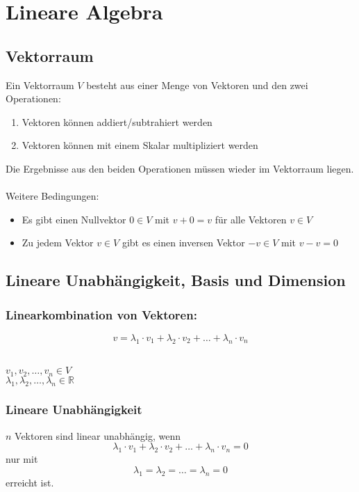 \chapter{Lineare Algebra}

\section{Vektorraum}

Ein Vektorraum $V$ besteht aus einer Menge von Vektoren und den zwei Operationen:
\begin{enumerate}
	\item Vektoren können addiert/subtrahiert werden
	\item Vektoren können mit einem Skalar multipliziert werden
\end{enumerate}
Die Ergebnisse aus den beiden Operationen müssen wieder im Vektorraum liegen.
\\\\
Weitere Bedingungen:
\begin{itemize}
	\item Es gibt einen Nullvektor $0\in V$ mit $v+0=v$ für alle Vektoren $v\in V$
	\item Zu jedem Vektor $v \in V$ gibt es einen inversen Vektor $-v\in V$ mit $v-v=0$
\end{itemize}

\section{Lineare Unabhängigkeit, Basis und Dimension}
\subsection{Linearkombination von Vektoren:}
\[
	v = \lambda_1 \cdot v_1 + \lambda_2 \cdot v_2 + \ldots + \lambda_n \cdot v_n
\]
~\\
\begin{footnotesize}
	$v_1,v_2,\ldots,v_n \in V$\\
	$\lambda_1,\lambda_2,\ldots,\lambda_n \in \mathds{R}$\\
\end{footnotesize}

\subsection{Lineare Unabhängigkeit}
$n$ Vektoren sind linear unabhängig, wenn
\[
	\lambda_1 \cdot v_1 + \lambda_2 \cdot v_2 + \ldots + \lambda_n \cdot v_n = 0
\]
nur mit
\[
	\lambda_1 = \lambda_2 = \ldots = \lambda_n = 0
\]
erreicht ist.\\
\begin{center}
\end{center}

